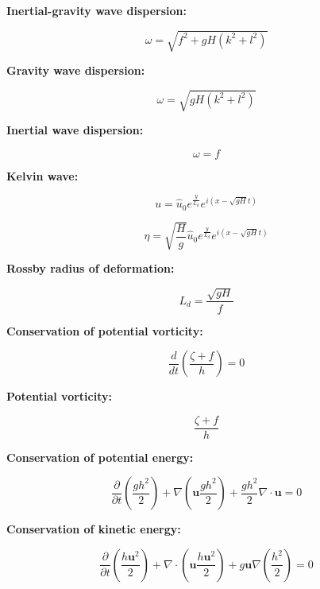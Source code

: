 \documentclass[12pt]{article}
\numberwithin{equation}{section}
\numberwithin{figure}{section}
\numberwithin{table}{section}
\begin{document}
\textbf{Inertial-gravity wave dispersion:}

\begin{equation}
  \omega = \sqrt{f^2 + gH(k^2 + l^2)}
\end{equation}

\textbf{Gravity wave dispersion:}

\begin{equation}
  \omega = \sqrt{gH(k^2 + l^2)}
\end{equation}

\textbf{Inertial wave dispersion:}

\begin{equation}
  \omega = f
\end{equation}

\textbf{Kelvin wave:}

\begin{equation}
  u = \widehat{u}_0 e^{\frac{y}{L_d}} e^{i(x - \sqrt{gH} t)}
\end{equation}

\begin{equation}
  \eta = \sqrt{\frac{H}{g}} \widehat{u}_0 e^{\frac{y}{L_d}} e^{i(x - \sqrt{gH} t)}
\end{equation}

\textbf{Rossby radius of deformation:}

\begin{equation}
  L_d = \frac{\sqrt{gH}}{f}
\end{equation}

\textbf{Conservation of potential vorticity:}

\begin{equation}
  \frac{d}{dt} \left( \frac{\zeta + f}{h} \right) = 0
\end{equation}

\textbf{Potential vorticity:}

\begin{equation}
  \frac{\zeta + f}{h}
\end{equation}

\textbf{Conservation of potential energy:}

\begin{equation}
  \frac{\partial}{\partial t} \left( \frac{gh^2}{2} \right) +
  \nabla \left( \mathbf{u} \frac{gh^2}{2} \right) +
  \frac{gh^2}{2} \nabla \cdot \mathbf{u} = 0
\end{equation}

\textbf{Conservation of kinetic energy:}

\begin{equation}
  \frac{\partial}{\partial t} \left( \frac{h \mathbf{u}^2}{2} \right)
  + \nabla \cdot \left( \mathbf{u} \frac{h \mathbf{u}^2}{2} \right)
  + g\mathbf{u}\nabla \left(\frac{h^2}{2}\right)
  = 0
\end{equation}
\end{document}
